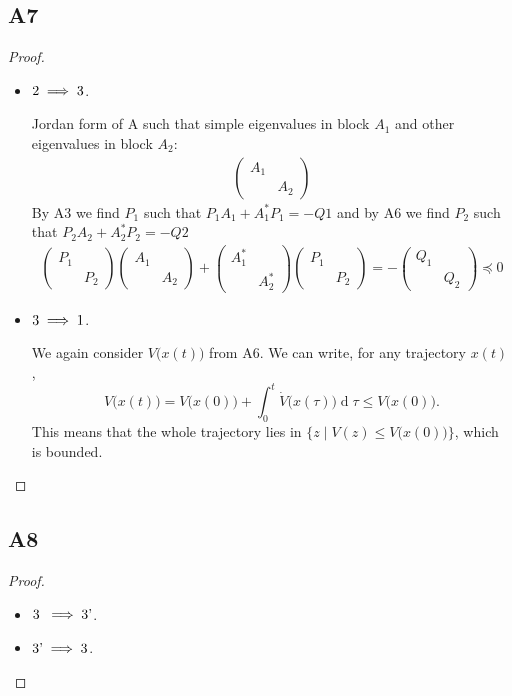 \documentclass[11pt]{article}
\DeclareMathOperator{\newdiff}{d} %
\newcommand{\dif}{\newdiff\!}
\begin{document}
\subsection*{A7}
\begin{proof}\leavevmode
\begin{itemize}
	\item \(\textnormal{2} \implies \textnormal{3}\).
	
	Jordan form of A such that simple eigenvalues in block $A_1$ and other eigenvalues in block $A_2$:
	\begin{align*}
	\begin{pmatrix}
	A_1 & \\
	& A_2
	\end{pmatrix}
	\end{align*}
	By A3 we find $P_1$ such that $P_1A_1+A_1^*P_1=-Q1$ and by A6 we find $P_2$ such that $P_2A_2+A_2^*P_2=-Q2$
	\begin{align*}
	\begin{pmatrix}
	P_1 & \\
	& P_2
	\end{pmatrix}
	\begin{pmatrix}
	A_1 & \\
	& A_2
	\end{pmatrix}
	+
	\begin{pmatrix}
	A_1^* & \\
	& A_2^*
	\end{pmatrix}
	\begin{pmatrix}
	P_1 & \\
	& P_2
	\end{pmatrix}=-
	\begin{pmatrix}
	Q_1 & \\
	& Q_2
	\end{pmatrix}\preceq 0
	\end{align*}
	\item \(\textnormal{3} \implies \textnormal{1}\).
	
	We again consider \(V\big(x(t)\big)\) from A6.
	We can write, for any trajectory \(x(t)\),
	\[
	V\big(x(t)\big) = V\big(x(0)\big) + \int_0^{t} \dot{V}\big(x(\tau)\big) \dif \tau \leqslant V\big(x(0)\big).
	\]
	This means that the whole trajectory lies in \(\Big\{z \mid V(z) \leqslant V\big(x(0)\big)\Big\}\), which is bounded.\qedhere
\end{itemize}
\end{proof}

\subsection*{A8}
\begin{proof}\leavevmode
\begin{itemize}
	\item \(\textnormal{3}\hphantom{'} \implies \textnormal{3'}\).
	
	\item \(\textnormal{3'} \implies \textnormal{3}\).
	
	\qedhere
\end{itemize}
\end{proof}
\end{document}
